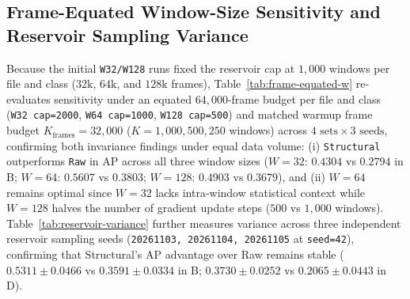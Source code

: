 \documentclass[12pt, a4paper, reqno, oneside]{book}
\DeclareRobustCommand{\code}[1]{\nolinkurl{#1}}
\begin{document}
{{\subsection{Frame-Equated Window-Size Sensitivity and Reservoir Sampling Variance}\label{subsec:frame-equated-w-and-reservoir}
Because the initial \code{W32/W128} runs fixed the reservoir cap at $1{,}000$ windows per file and class ($32\text{k}$, $64\text{k}$, and $128\text{k}$ frames), Table~\ref{tab:frame-equated-w} re-evaluates sensitivity under an equated $64{,}000$-frame budget per file and class (\code{W32 cap=2000}, \code{W64 cap=1000}, \code{W128 cap=500}) and matched warmup frame budget $K_{\text{frames}}=32{,}000$ ($K=1{,}000, 500, 250$ windows) across $4\text{ sets} \times 3\text{ seeds}$, confirming both invariance findings under equal data volume: (i) \code{Structural} outperforms \code{Raw} in AP across all three window sizes ($W=32$: $0.4304$ vs $0.2794$ in B; $W=64$: $0.5607$ vs $0.3803$; $W=128$: $0.4903$ vs $0.3679$), and (ii) $W=64$ remains optimal since $W=32$ lacks intra-window statistical context while $W=128$ halves the number of gradient update steps ($500$ vs $1{,}000$ windows). Table~\ref{tab:reservoir-variance} further measures variance across three independent reservoir sampling seeds (\code{20261103, 20261104, 20261105} at \code{seed=42}), confirming that Structural's AP advantage over Raw remains stable ($0.5311 \pm 0.0466$ vs $0.3591 \pm 0.0334$ in B; $0.3730 \pm 0.0252$ vs $0.2065 \pm 0.0443$ in D).

}}
\end{document}
